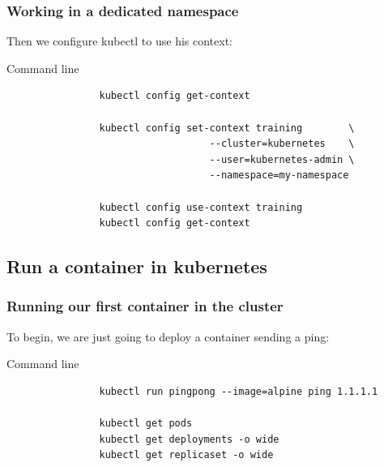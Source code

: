 	\begin{frame}[fragile]
		\frametitle{Working in a dedicated namespace}
	
		Then we configure kubectl to use his context:
		\begin{block}{Command line}
			\begin{verbatim}
				kubectl config get-context
				
				kubectl config set-context training        \
				                   --cluster=kubernetes    \
				                   --user=kubernetes-admin \
				                   --namespace=my-namespace
							
				kubectl config use-context training
				kubectl config get-context
			\end{verbatim}
		\end{block}
	\end{frame}
	
\subsection{Run a container in kubernetes}	
	
	\begin{frame}[fragile]
		\frametitle{Running our first container in the cluster}
	
		To begin, we are just going to deploy a container sending a ping:
		\begin{block}{Command line}
			\begin{verbatim}
				kubectl run pingpong --image=alpine ping 1.1.1.1
				
				kubectl get pods
				kubectl get deployments -o wide
				kubectl get replicaset -o wide
			\end{verbatim}
		\end{block}
	\end{frame}
	
